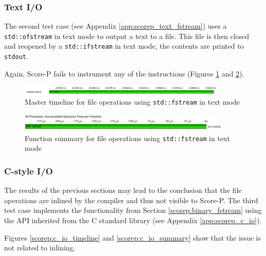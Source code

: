 \subsubsection{Text I/O}

The second test case (see Appendix \ref{app:scorep_text_fstream}) uses a \texttt{std::ofstream} in text mode to output a text to a file. This file is then closed and reopened by a \texttt{std::ifstream} in text mode, the contents are printed to \texttt{stdout}.

Again, Score-P fails to instrument any of the instructions (Figures \ref{scorep:text_fstream_timeline} and \ref{scorep:text_fstream_summary}).

\begin{figure}[htbp]
	\begin{center}
		\includegraphics[width=0.9\textwidth]{img/scorep_text_fstream_timeline.png}
		\caption{Master timeline for file operations using \texttt{std::fstream} in text mode}
		\label{scorep:text_fstream_timeline}
	\end{center}
\end{figure}

\begin{figure}[htbp]
	\begin{center}
		\includegraphics[width=0.9\textwidth]{img/scorep_text_fstream_summary.png}
		\caption{Function summary for file operations using \texttt{std::fstream} in text mode}
		\label{scorep:text_fstream_summary}
	\end{center}
\end{figure}

\subsubsection{C-style I/O}

The results of the previous sections may lead to the conclusion that the file operations are inlined by the compiler and thus not visible to Score-P. The third test case implements the functionality from Section \ref{scorep:binary_fstream} using the API inherited from the C standard library (see Appendix \ref{app:scorep_c_io}).

Figures \ref{scorep:c_io_timeline} and \ref{scorep:c_io_summary} show that the issue is not related to inlining. 

